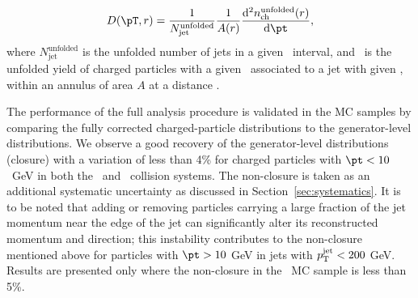 \begin{align*}
   \Dptr = \frac{1}{N_\mathrm{jet}^\mathrm{unfolded}} \frac{1}{A(r)} \frac{\fd^2 \nchunf(r)}{\fd \pt},
 \end{align*}
where $N_\mathrm{jet}^\mathrm{unfolded}$ is the unfolded number of jets in a given \ptjet\ interval, and \nchunf\  is the unfolded yield of charged particles with a given \pt\ associated to a jet with given \ptjet, within an annulus of area $A$ at a distance \rvar.

The performance of the full analysis procedure is validated in the MC samples by comparing the fully corrected charged-particle distributions to the generator-level distributions.
We observe a good recovery of the generator-level distributions (closure) with a variation of less than 4\% for charged particles with \mbox{$\pt < 10$ GeV} in both the \pp\ and \pbpb\ collision systems.
The non-closure is taken as an additional systematic uncertainty as discussed in Section~\ref{sec:systematics}.
It is to be noted that adding or removing particles carrying a large fraction of the jet momentum near the edge of the jet can significantly alter its reconstructed momentum and direction; this instability contributes to the non-closure mentioned above for particles with $\pt > 10$ GeV in jets with $\mbox{$p_{\mathrm{T}}^{\mathrm{jet}}$} < 200$ GeV.
Results are presented only where the non-closure in the \pp\ MC sample is less than 5\%.




